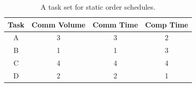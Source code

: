 \documentclass[sigconf]{acmart}
\begin{document}
	\begin{table}[htb]
		\begin{center}
			
			\begin{tabular}{|c|c|c|c|}
				\hline
				Task & Comm Volume & Comm Time & Comp Time\\ \hline 
				A & 3 & 3 &  2\\ \hline
				B & 1 & 1 & 3\\ \hline
				C & 4 & 4 & 4\\ \hline
				D & 2 & 2 & 1\\ \hline
			\end{tabular}
			\caption{\label{tab:staticOrderExample} A task set for static order schedules.}
		\end{center}
	\end{table}
	
	\newcommand{\schedule}[3]{
		\draw[->] (-0.2, 0) -- (#1, 0) node[below] {$t$};
		\draw (0, 0) -- (0, 1.5);
		\node at (-0.8, 0.75)[rotate=90] {#2};
		\draw[dashed,gray] (0, 0.75) -- (#1, 0.75);
		\foreach \t in {0,#3} {
			\node[xtick=\t] at (\t, 0){};
		}
	}
	\newcommand{\task}[6][0]{
		\node[comm=#2 start #3 length #4 color #6]{};
		\node[comp=#2 start #3+#4+#1 length #5 color #6]{}; 
	}
	
\end{document}
